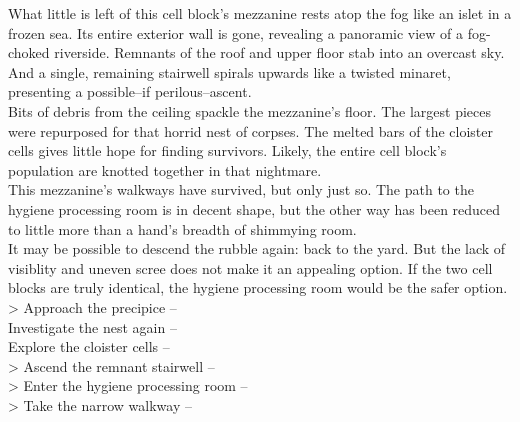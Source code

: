 What little is left of this cell block’s mezzanine rests atop the fog like an islet in a frozen sea. Its entire exterior wall is gone, revealing a panoramic view of a fog-choked riverside. Remnants of the roof and upper floor stab into an overcast sky. And a single, remaining stairwell spirals upwards like a twisted minaret, presenting a possible--if perilous--ascent.\\

Bits of debris from the ceiling spackle the mezzanine's floor. The largest pieces were repurposed for that horrid nest of corpses. The melted bars of the cloister cells gives little hope for finding survivors. Likely, the entire cell block's population are knotted together in that nightmare.\\

This mezzanine's walkways have survived, but only just so. The path to the hygiene processing room is in decent shape, but the other way has been reduced to little more than a hand's breadth of shimmying room.\\

It may be possible to descend the rubble again: back to the yard. But the lack of visiblity and uneven scree does not make it an appealing option. If the two cell blocks are truly identical, the hygiene processing room would be the safer option.\\

> Approach the precipice -- \\
 Investigate the nest again -- \\
 Explore the cloister cells -- \\
> Ascend the remnant stairwell -- \\
> Enter the hygiene processing room -- \\
> Take the narrow walkway -- 